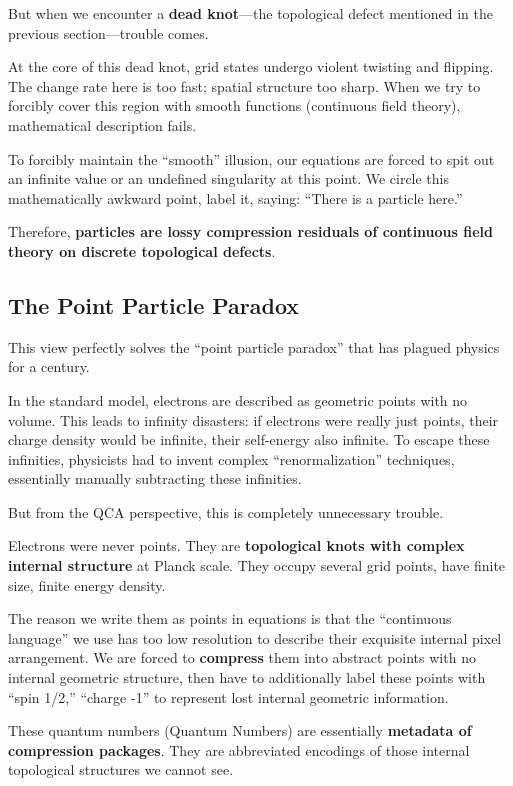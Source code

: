 But when we encounter a \textbf{dead knot}---the topological defect mentioned in the previous section---trouble comes.

At the core of this dead knot, grid states undergo violent twisting and flipping. The change rate here is too fast; spatial structure too sharp. When we try to forcibly cover this region with smooth functions (continuous field theory), mathematical description fails.

To forcibly maintain the ``smooth'' illusion, our equations are forced to spit out an infinite value or an undefined singularity at this point. We circle this mathematically awkward point, label it, saying: ``There is a particle here.''

Therefore, \textbf{particles are lossy compression residuals of continuous field theory on discrete topological defects}.

\subsection{The Point Particle Paradox}

This view perfectly solves the ``point particle paradox'' that has plagued physics for a century.

In the standard model, electrons are described as geometric points with no volume. This leads to infinity disasters: if electrons were really just points, their charge density would be infinite, their self-energy also infinite. To escape these infinities, physicists had to invent complex ``renormalization'' techniques, essentially manually subtracting these infinities.

But from the QCA perspective, this is completely unnecessary trouble.

Electrons were never points. They are \textbf{topological knots with complex internal structure} at Planck scale. They occupy several grid points, have finite size, finite energy density.

The reason we write them as points in equations is that the ``continuous language'' we use has too low resolution to describe their exquisite internal pixel arrangement. We are forced to \textbf{compress} them into abstract points with no internal geometric structure, then have to additionally label these points with ``spin 1/2,'' ``charge -1'' to represent lost internal geometric information.

These quantum numbers (Quantum Numbers) are essentially \textbf{metadata of compression packages}. They are abbreviated encodings of those internal topological structures we cannot see.

